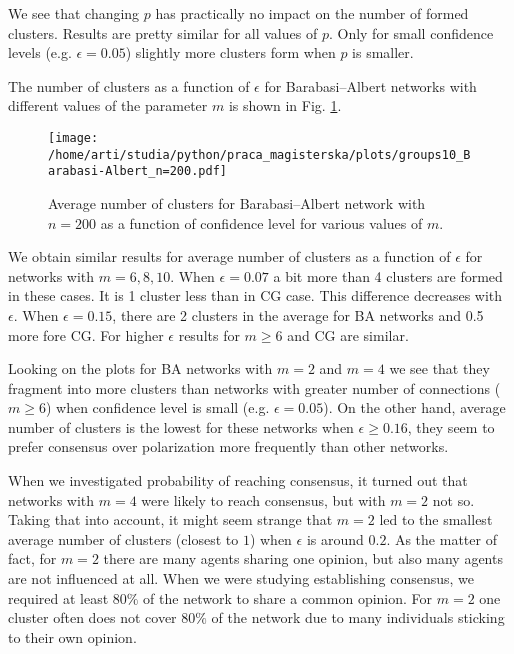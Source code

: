 \documentclass[a4paper, 12pt]{article}
\begin{document}
We see that changing $p$ has practically no impact on the number of formed clusters. Results are pretty similar for all values of $p$. Only for small confidence levels (e.g. $\epsilon=0.05$) slightly more clusters form when $p$ is smaller.

\indent

The number of clusters as a function of $\epsilon$ for Barabasi--Albert networks with different values of the parameter $m$ is shown in Fig. \ref{f29}.

\begin{figure}[H]
		\centering
		\texttt{[image: /home/arti/studia/python/praca\_magisterska/plots/groups10\_Barabasi-Albert\_n=200.pdf]}
		\caption{Average number of clusters for Barabasi--Albert network with $n=200$ as a function of confidence level for various values of $m$.}
		\label{f29}
\end{figure}

We obtain similar results for average number of clusters as a function of $\epsilon$ for networks with $m=6,8,10$. When $\epsilon=0.07$ a bit more than 4 clusters are formed in these cases. It is 1 cluster less than in CG case. This difference decreases with $\epsilon$. When $\epsilon=0.15$, there are 2 clusters in the average for BA networks and 0.5 more fore CG. For higher $\epsilon$ results for $m \geq 6$ and CG are similar.

Looking on the plots for BA networks with $m=2$ and $m=4$ we see that they fragment into more clusters than networks with greater number of connections ($m \geq 6$) when confidence level is small (e.g. $\epsilon=0.05$). On the other hand, average number of clusters is the lowest for these networks when $\epsilon \geq 0.16$, they seem to prefer consensus over polarization more frequently than other networks.

\indent
When we investigated probability of reaching consensus, it turned out that networks with $m=4$ were likely to reach consensus, but with $m=2$ not so. Taking that into account, it might seem strange that $m=2$ led to the smallest average number of clusters (closest to $1$) when $\epsilon$ is around $0.2$. As the matter of fact, for $m=2$ there are many agents sharing one opinion, but also many agents are not influenced at all. When we were studying establishing consensus, we required at least $80\%$ of the network to share a common opinion. For $m=2$ one cluster often does not cover $80\%$ of the network due to many individuals sticking to their own opinion.
\end{document}
